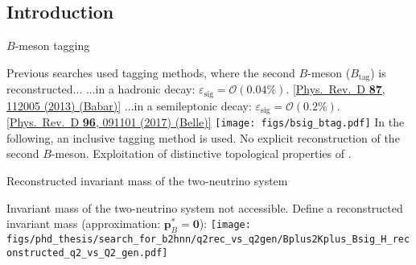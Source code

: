 \subsection{Introduction}
\begin{frame}{$B$-meson tagging}
\bi
\item Previous searches used tagging methods, where the second $B$-meson ($B_{\mathrm{tag}}$) is reconstructed...
\bi
\itemiii ...in a hadronic decay: $\varepsilon_{\mathrm{sig}}=\mathcal{O}(0.04\%)$. \hfill \href{https://doi.org/10.1103/PhysRevD.87.112005}{\color{blue!40!gray} \tiny [Phys.~Rev.~D \textbf{87}, 112005 (2013) (Babar)]}
\itemiii ...in a semileptonic decay: $\varepsilon_{\mathrm{sig}}=\mathcal{O}(0.2\%)$. \hfill \href{https://doi.org/10.1103/PhysRevD.96.091101}{\color{blue!40!gray} \tiny [Phys.~Rev.~D \textbf{96}, 091101 (2017) (Belle)]}
\ei
\ei
\vspace{0.25cm}
\centering
\texttt{[image: figs/bsig\_btag.pdf]}
\bi
\itemi In the following, an inclusive tagging method is used.
\bi
\itemiii No explicit reconstruction of the second $B$-meson.
\itemiii Exploitation of distinctive topological properties of \BKpnn.
\ei
\ei
\end{frame}
\begin{frame}{Reconstructed invariant mass of the two-neutrino system}
\bi
\item Invariant mass of the two-neutrino system not accessible.
\bi
{}
\ei
\itemii Define a reconstructed invariant mass (approximation: $\mathbf{p}^*_B=\mathbf{0}$):
\bi
{}
\ei
\ei
\vspace{0.5cm}
\centering
\texttt{[image: figs/phd\_thesis/search\_for\_b2hnn/q2rec\_vs\_q2gen/Bplus2Kplus\_Bsig\_H\_reconstructed\_q2\_vs\_Q2\_gen.pdf]}
\end{frame}

